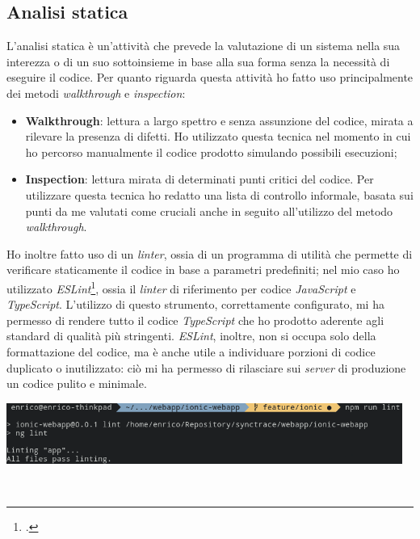 \subsection{Analisi statica}

L'analisi statica è un'attività che prevede la valutazione di un sistema nella sua interezza o di un suo sottoinsieme in base alla sua forma senza la necessità di eseguire il codice. Per quanto riguarda questa attività ho fatto uso principalmente dei metodi \textit{walkthrough} e \textit{inspection}:

\begin{itemize}
  \item \textbf{Walkthrough}: lettura a largo spettro e senza assunzione del codice, mirata a rilevare la presenza di difetti. Ho utilizzato questa tecnica nel momento in cui ho percorso manualmente il codice prodotto simulando possibili esecuzioni;
  \item \textbf{Inspection}: lettura mirata di determinati punti critici del codice. Per utilizzare questa tecnica ho redatto una lista di controllo informale, basata sui punti da me valutati come cruciali anche in seguito all'utilizzo del metodo \textit{walkthrough}.
\end{itemize}

Ho inoltre fatto uso di un \textit{linter}, ossia di un programma di utilità che permette di verificare staticamente il codice in base a parametri predefiniti; nel mio caso ho utilizzato \textit{ESLint}\footcite{tec:eslint}, ossia il \textit{linter} di riferimento per codice \textit{JavaScript} e \textit{TypeScript}. L'utilizzo di questo strumento, correttamente configurato, mi ha permesso di rendere tutto il codice \textit{TypeScript} che ho prodotto aderente agli standard di qualità più stringenti. \textit{ESLint}, inoltre, non si occupa solo della formattazione del codice, ma è anche utile a individuare porzioni di codice duplicato o inutilizzato: ciò mi ha permesso di rilasciare sui \textit{server} di produzione un codice pulito e minimale. \\

\begin{minipage}{\linewidth}
  \label{img:nglint}
  \centering
    \includegraphics[height=2cm]{immagini/nglint}
\end{minipage} \\

